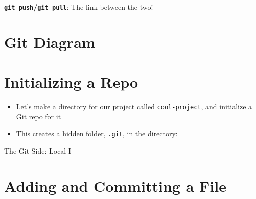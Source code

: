 \documentclass[
  letterpaper,
  DIV=11,
  numbers=noendperiod,
  oneside]{scrreprt}
\newenvironment{Shaded}{\begin{snugshade}}{\end{snugshade}}
\newcommand{\AttributeTok}[1]{\textcolor[rgb]{0.40,0.45,0.13}{#1}}
\newcommand{\ExtensionTok}[1]{\textcolor[rgb]{0.00,0.23,0.31}{#1}}
\newcommand{\NormalTok}[1]{\textcolor[rgb]{0.00,0.23,0.31}{#1}}
\providecommand{\tightlist}{%
  \setlength{\itemsep}{0pt}\setlength{\parskip}{0pt}}\usepackage{longtable,booktabs,array}
\begin{document}
\textbf{\texttt{git\ push}/\texttt{git\ pull}}: The link between the
two!

\hypertarget{git-diagram-1}{%
\section{Git Diagram}\label{git-diagram-1}}

\hypertarget{initializing-a-repo-1}{%
\section{Initializing a Repo}\label{initializing-a-repo-1}}

\begin{itemize}
\tightlist
\item
  Let's make a directory for our project called \texttt{cool-project},
  and initialize a Git repo for it
\end{itemize}

\begin{Shaded}
\end{Shaded}

\begin{itemize}
\tightlist
\item
  This creates a hidden folder, \texttt{.git}, in the directory:
\end{itemize}

\begin{Shaded}
\end{Shaded}

The Git Side: Local I

\hypertarget{adding-and-committing-a-file-1}{%
\section{Adding and Committing a
File}\label{adding-and-committing-a-file-1}}
\end{document}
